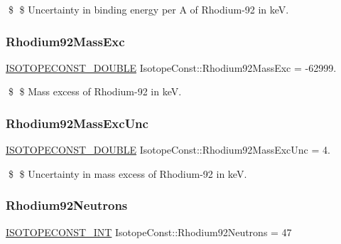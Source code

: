 \$ \$ Uncertainty in binding energy per A of Rhodium-\/92 in keV. \mbox{\label{group___isotope_const-_rhodium-_rh92_ga75c4c5c6243a8ede8a96f6d5b1d7e8f2}} 
\subsubsection{\texorpdfstring{Rhodium92\+Mass\+Exc}{Rhodium92MassExc}}
{\footnotesize\ttfamily \mbox{\hyperlink{group___isotope_const-_macros_ga8f45a7272ce02c0b4c65c44636ed719a}{I\+S\+O\+T\+O\+P\+E\+C\+O\+N\+S\+T\+\_\+\+D\+O\+U\+B\+LE}} Isotope\+Const\+::\+Rhodium92\+Mass\+Exc = -\/62999.}

\$ \$ Mass excess of Rhodium-\/92 in keV. \mbox{\label{group___isotope_const-_rhodium-_rh92_gac14df2bd2e41dcfd75355ec3d5bfc8de}} 
\subsubsection{\texorpdfstring{Rhodium92\+Mass\+Exc\+Unc}{Rhodium92MassExcUnc}}
{\footnotesize\ttfamily \mbox{\hyperlink{group___isotope_const-_macros_ga8f45a7272ce02c0b4c65c44636ed719a}{I\+S\+O\+T\+O\+P\+E\+C\+O\+N\+S\+T\+\_\+\+D\+O\+U\+B\+LE}} Isotope\+Const\+::\+Rhodium92\+Mass\+Exc\+Unc = 4.}

\$ \$ Uncertainty in mass excess of Rhodium-\/92 in keV. \mbox{\label{group___isotope_const-_rhodium-_rh92_ga69efd7715ce01ab31851749eac34a332}} 
\subsubsection{\texorpdfstring{Rhodium92\+Neutrons}{Rhodium92Neutrons}}
{\footnotesize\ttfamily \mbox{\hyperlink{group___isotope_const-_macros_ga5f18360b3e99483a35c32d789e62621c}{I\+S\+O\+T\+O\+P\+E\+C\+O\+N\+S\+T\+\_\+\+I\+NT}} Isotope\+Const\+::\+Rhodium92\+Neutrons = 47}

